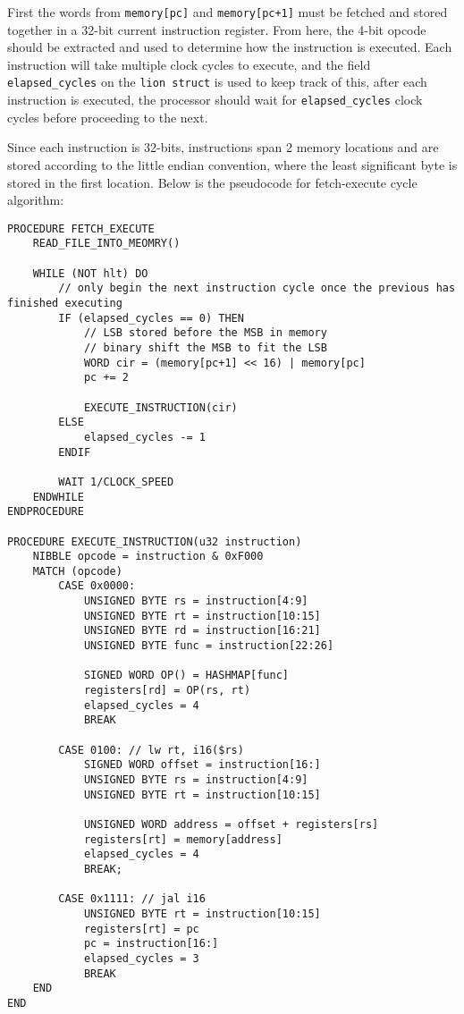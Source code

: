 First the words from \texttt{memory[pc]} and \texttt{memory[pc+1]} must be fetched and stored together in a 32-bit current instruction register. From here, the 4-bit opcode should be extracted and used to determine how the instruction is executed. Each instruction will take multiple clock cycles to execute, and the field \texttt{elapsed\_cycles} on the \texttt{lion struct} is used to keep track of this, after each instruction is executed, the processor should wait for \texttt{elapsed\_cycles} clock cycles before proceeding to the next. 

Since each instruction is 32-bits, instructions span 2 memory locations and are stored according to the little endian convention, where the least significant byte is stored in the first location. Below is the pseudocode for fetch-execute cycle algorithm: 

\begin{lstlisting}
PROCEDURE FETCH_EXECUTE 
    READ_FILE_INTO_MEOMRY()

    WHILE (NOT hlt) DO 
        // only begin the next instruction cycle once the previous has finished executing
        IF (elapsed_cycles == 0) THEN 
            // LSB stored before the MSB in memory
            // binary shift the MSB to fit the LSB
            WORD cir = (memory[pc+1] << 16) | memory[pc]
            pc += 2

            EXECUTE_INSTRUCTION(cir)
        ELSE 
            elapsed_cycles -= 1
        ENDIF

        WAIT 1/CLOCK_SPEED
    ENDWHILE
ENDPROCEDURE

PROCEDURE EXECUTE_INSTRUCTION(u32 instruction)
    NIBBLE opcode = instruction & 0xF000 
    MATCH (opcode) 
        CASE 0x0000: 
            UNSIGNED BYTE rs = instruction[4:9]
            UNSIGNED BYTE rt = instruction[10:15]
            UNSIGNED BYTE rd = instruction[16:21]
            UNSIGNED BYTE func = instruction[22:26]

            SIGNED WORD OP() = HASHMAP[func] 
            registers[rd] = OP(rs, rt)
            elapsed_cycles = 4
            BREAK

        CASE 0100: // lw rt, i16($rs)
            SIGNED WORD offset = instruction[16:]
            UNSIGNED BYTE rs = instruction[4:9]
            UNSIGNED BYTE rt = instruction[10:15]

            UNSIGNED WORD address = offset + registers[rs]
            registers[rt] = memory[address]
            elapsed_cycles = 4
            BREAK;

        CASE 0x1111: // jal i16
            UNSIGNED BYTE rt = instruction[10:15]
            registers[rt] = pc
            pc = instruction[16:]
            elapsed_cycles = 3
            BREAK
    END
END
\end{lstlisting}


